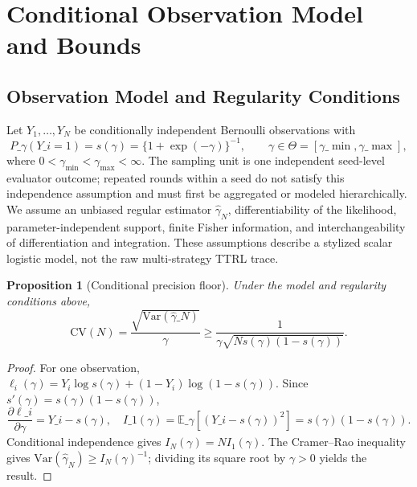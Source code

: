 \documentclass[11pt]{article}
\newtheorem{proposition}{Proposition}
\begin{document}
\section{Conditional Observation Model and Bounds}

\subsection{Observation Model and Regularity Conditions}

Let $Y_1,\ldots,Y_N$ be conditionally independent Bernoulli observations with
\[
P\_\gamma(Y\_i=1)=s(\gamma)=\{1+\exp(-\gamma)\}^{-1},
\qquad \gamma\in\Theta=[\gamma\_{\min},\gamma\_{\max}],
\]
where $0<\gamma_{\min}<\gamma_{\max}<\infty$. The sampling unit is one independent seed-level evaluator outcome; repeated rounds within a seed do not satisfy this independence assumption and must first be aggregated or modeled hierarchically. We assume an unbiased regular estimator $\hat\gamma_N$, differentiability of the likelihood, parameter-independent support, finite Fisher information, and interchangeability of differentiation and integration. These assumptions describe a stylized scalar logistic model, not the raw multi-strategy TTRL trace.

\begin{proposition}[Conditional precision floor]\label{thm:coupling-precision}
Under the model and regularity conditions above,
\[
\mathrm{CV}(N)=\frac{\sqrt{\mathrm{Var}(\hat\gamma\_N)}}{\gamma}
\geq \frac{1}{\gamma\sqrt{N s(\gamma)(1-s(\gamma))}}.
\]
\end{proposition}

\begin{proof}
For one observation, $\ell_i(\gamma)=Y_i\log s(\gamma)+(1-Y_i)\log(1-s(\gamma))$. Since $s'(\gamma)=s(\gamma)(1-s(\gamma))$,
\[
\frac{\partial\ell\_i}{\partial\gamma}=Y\_i-s(\gamma),
\quad I\_1(\gamma)=\mathbb{E}\_\gamma[(Y\_i-s(\gamma))^2]=s(\gamma)(1-s(\gamma)).
\]
Conditional independence gives $I_N(\gamma)=NI_1(\gamma)$. The Cramer--Rao inequality gives $\mathrm{Var}(\hat\gamma_N)\ge I_N(\gamma)^{-1}$; dividing its square root by $\gamma>0$ yields the result.
\end{proof}
\end{document}
